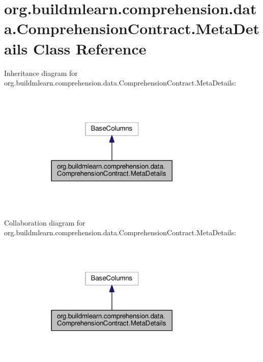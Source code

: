 \hypertarget{classorg_1_1buildmlearn_1_1comprehension_1_1data_1_1ComprehensionContract_1_1MetaDetails}{}\section{org.\+buildmlearn.\+comprehension.\+data.\+Comprehension\+Contract.\+Meta\+Details Class Reference}
\label{classorg_1_1buildmlearn_1_1comprehension_1_1data_1_1ComprehensionContract_1_1MetaDetails}


Inheritance diagram for org.\+buildmlearn.\+comprehension.\+data.\+Comprehension\+Contract.\+Meta\+Details\+:
\nopagebreak
\begin{figure}[H]
\begin{center}
\leavevmode
\includegraphics[width=258pt]{classorg_1_1buildmlearn_1_1comprehension_1_1data_1_1ComprehensionContract_1_1MetaDetails__inherit__graph}
\end{center}
\end{figure}


Collaboration diagram for org.\+buildmlearn.\+comprehension.\+data.\+Comprehension\+Contract.\+Meta\+Details\+:
\nopagebreak
\begin{figure}[H]
\begin{center}
\leavevmode
\includegraphics[width=258pt]{classorg_1_1buildmlearn_1_1comprehension_1_1data_1_1ComprehensionContract_1_1MetaDetails__coll__graph}
\end{center}
\end{figure}
